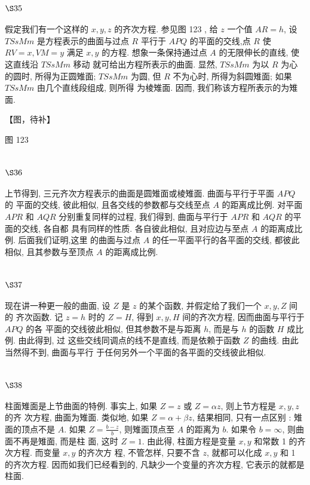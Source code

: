\section{$\S 35$}

假定我们有一个这样的 $x, y, z$ 的齐次方程. 参见图 123 , 给 $z$ 一个值 $A R=h$, 设 $T S s M m$ 是方程表示的曲面与过点 $R$ 平行于 $A P Q$ 的平面的交线,点 $R$ 使 $R V=x, V M=y$ 满足 $x, y$ 的方程. 想象一条保持通过点 $A$ 的无限伸长的直线, 使这直线沿 $T S s M m$ 移动 就可给出方程所表示的曲面. 显然, $T S s M m$ 为以 $R$ 为心的圆时, 所得为正圆雉面; $T S s M m$ 为圆, 但 $R$ 不为心时, 所得为斜圆雉面; 如果 $T S s M m$ 由几个直线段组成, 则所得 为棱雉面. 因而, 我们称该方程所表示的为雉面.


【图，待补】

图 123

\section{$\S 36$}

上节得到, 三元齐次方程表示的曲面是圆雉面或棱雉面. 曲面与平行于平面 $A P Q$ 的 平面的交线, 彼此相似, 且各交线的参数都与交线至点 $A$ 的距离成比例. 对平面 $A P R$ 和 $A Q R$ 分别重复同样的过程, 我们得到, 曲面与平行于 $A P R$ 和 $A Q R$ 的平面的交线, 各自都 具有同样的性质. 各自彼此相似, 且对应边与至点 $A$ 的距离成比例. 后面我们证明,这里 的曲面与过点 $A$ 的任一平面平行的各平面的交线, 都彼此相似, 且其参数与至顶点 $A$ 的距离成比例.

\section{$\S 37$}

现在讲一种更一般的曲面, 设 $Z$ 是 $z$ 的某个函数, 并假定给了我们一个 $x, y, Z$ 间的 齐次函数. 记 $z=h$ 时的 $Z=H$, 得到 $x, y, H$ 间的齐次方程, 因而曲面与平行于 $A P Q$ 的各 平面的交线彼此相似, 但其参数不是与距离 $h$, 而是与 $h$ 的函数 $H$ 成比例. 由此得到, 过 这些交线同调点的线不是直线, 而是依赖于函数 $Z$ 的曲线. 由此当然得不到, 曲面与平行 于任何另外一个平面的各平面的交线彼此相似.

\section{$\S 38$}

柱面雉面是上节曲面的特例. 事实上, 如果 $Z=z$ 或 $Z=\alpha z$, 则上节方程是 $x, y, z$ 的齐 次方程, 曲面为雉面. 类似地, 如果 $Z=\alpha+\beta z$, 结果相同, 只有一点区别 : 雉面的顶点不是 $A$. 如果 $Z=\frac{b-z}{b}$, 则雉面顶点至 $A$ 的距离为 $b$. 如果令 $b=\infty$, 则曲面不再是雉面, 而是柱 面, 这时 $Z=1$. 由此得, 柱面方程是变量 $x, y$ 和常数 1 的齐次方程. 而变量 $x, y$ 的齐次方 程, 不管怎样, 只要不含 $z$, 就都可以化成 $x, y$ 和 1 的齐次方程. 因而如我们已经看到的, 凡缺少一个变量的齐次方程, 它表示的就都是柱面.

